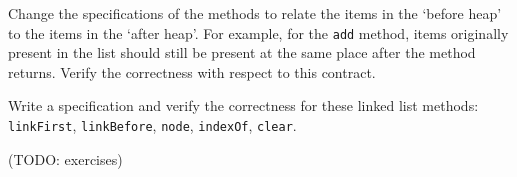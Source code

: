 \documentclass[runningheads]{llncs}
\begin{document}
\begin{exercise}
Change the specifications of the methods to relate the items in the `before heap' to the items in the `after heap'. For example, for the \texttt{add} method, items originally present in the list should still be present at the same place after the method returns. Verify the correctness with respect to this contract.
\end{exercise}

\begin{exercise}
Write a specification and verify the correctness for these linked list methods: \texttt{linkFirst}, \texttt{linkBefore}, \texttt{node}, \texttt{indexOf}, \texttt{clear}.
\end{exercise}

(TODO: exercises)




\end{document}
